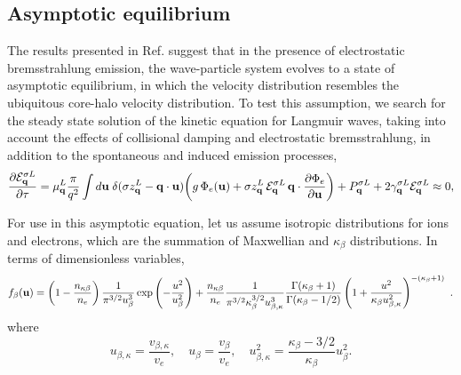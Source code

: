 \documentclass[12pt,a4paper,ruledheader]{report}
\def\calE{{\cal E}}
\begin{document}
\begin{appendix}
\chapter{Asymptotic equilibrium}
\label{appB}
The results presented in Ref. \cite{Tigik2017a} suggest that in the presence
of electrostatic bremsstrahlung emission, the wave-particle system evolves to
a state of asymptotic equilibrium, in which the velocity distribution resembles
the ubiquitous core-halo velocity distribution. To test this assumption, we
search for the steady state solution of the kinetic equation for Langmuir waves,
taking into account the effects of collisional damping and electrostatic
bremsstrahlung, in addition to the spontaneous and induced emission processes,
\begin{equation}
  \frac{\partial {\cal E}_{\bf q}^{\sigma L}}
  {\partial \tau}
  =\mu_{\bf q}^L\frac{\pi}{q^2}
  \int d{\bf u}\;\delta(\sigma
  z_{\bf q}^L-{\bf q}\cdot{\bf u})\biggl(g\,\Phi_e({\bf u})
  +\sigma z_{\bf q}^L\,{\cal E}_{\bf q}^{\sigma L}
  \,{\bf q}\cdot\frac{\partial \Phi_e}{\partial{\bf u}}\biggr)
  +P_{\bf q}^{\sigma L}+2\gamma_{\bf q}^{\sigma L}\calE_{\bf q}^{\sigma L}\approx 0,
  \label{asymp}
\end{equation}

For use in this asymptotic equation, let us assume isotropic distributions for
ions and electrons, which are the summation of Maxwellian and $\kappa_\beta$
distributions. In terms of dimensionless variables,
\begin{equation}
\label{fbeta}
f_{\beta}({\bf u})= \left(1-\frac{n_{\kappa\beta}}{n_e}\right)
\frac{1}{\pi^{3/2} u_{\beta}^3}\exp\left(-\frac{u^2}{u_\beta^2}\right)
+\frac{n_{\kappa\beta}}{n_e}\frac{1}{\pi^{3/2} \kappa_\beta^{3/2}
u_{\beta,\kappa}^3}
\frac{\Gamma(\kappa_\beta+1)}{\Gamma(\kappa_\beta-1/2)}
\left(1+\frac{u^2}{\kappa_\beta u_{\beta,\kappa}^2}
\right)^{-(\kappa_\beta+1)}~.
\end{equation}
where
\begin{equation}
u_{\beta,\kappa}= \frac{v_{\beta,\kappa}}{v_e},\quad
u_\beta=\frac{v_\beta}{v_e},\quad
u_{\beta,\kappa}^2= \frac{\kappa_\beta-3/2}{\kappa_\beta} u_\beta^2.
\end{equation}


\end{appendix}
\end{document}
